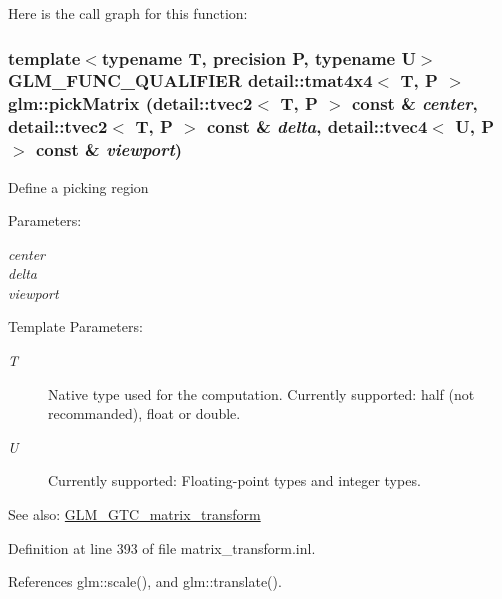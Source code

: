 Here is the call graph for this function:\hypertarget{group__gtc__matrix__transform_g42972db8a1c73829999a8454d11fa4a3}{
\subsubsection[pickMatrix]{\setlength{\rightskip}{0pt plus 5cm}template$<$typename T, precision P, typename U$>$ GLM\_\-FUNC\_\-QUALIFIER detail::tmat4x4$<$ T, P $>$ glm::pickMatrix (detail::tvec2$<$ T, P $>$ const \& {\em center}, \/  detail::tvec2$<$ T, P $>$ const \& {\em delta}, \/  detail::tvec4$<$ U, P $>$ const \& {\em viewport})}}
\label{group__gtc__matrix__transform_g42972db8a1c73829999a8454d11fa4a3}


Define a picking region

\begin{Desc}
\item[Parameters:]
\begin{description}
\item[{\em center}]\item[{\em delta}]\item[{\em viewport}]\end{description}
\end{Desc}
\begin{Desc}
\item[Template Parameters:]
\begin{description}
\item[{\em T}]Native type used for the computation. Currently supported: half (not recommanded), float or double. \item[{\em U}]Currently supported: Floating-point types and integer types. \end{description}
\end{Desc}
\begin{Desc}
\item[See also:]\hyperlink{group__gtc__matrix__transform}{GLM\_\-GTC\_\-matrix\_\-transform} \end{Desc}


Definition at line 393 of file matrix\_\-transform.inl.

References glm::scale(), and glm::translate().

